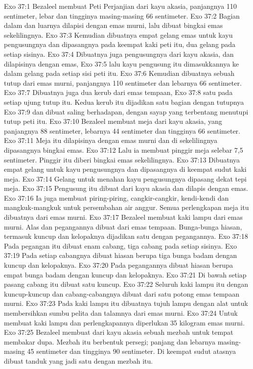 Exo 37:1  Bezaleel membuat Peti Perjanjian dari kayu akasia, panjangnya 110 sentimeter, lebar dan tingginya masing-masing 66 sentimeter.
Exo 37:2  Bagian dalam dan luarnya dilapisi dengan emas murni, lalu dibuat bingkai emas sekelilingnya.
Exo 37:3  Kemudian dibuatnya empat gelang emas untuk kayu pengusungnya dan dipasangnya pada keempat kaki peti itu, dua gelang pada setiap sisinya.
Exo 37:4  Dibuatnya juga pengusungnya dari kayu akasia, dan dilapisinya dengan emas,
Exo 37:5  lalu kayu pengusung itu dimasukkannya ke dalam gelang pada setiap sisi peti itu.
Exo 37:6  Kemudian dibuatnya sebuah tutup dari emas murni, panjangnya 110 sentimeter dan lebarnya 66 sentimeter.
Exo 37:7  Dibuatnya juga dua kerub dari emas tempaan,
Exo 37:8  satu pada setiap ujung tutup itu. Kedua kerub itu dijadikan satu bagian dengan tutupnya
Exo 37:9  dan dibuat saling berhadapan, dengan sayap yang terbentang menutupi tutup peti itu.
Exo 37:10  Bezaleel membuat meja dari kayu akasia, yang panjangnya 88 sentimeter, lebarnya 44 sentimeter dan tingginya 66 sentimeter.
Exo 37:11  Meja itu dilapisinya dengan emas murni dan di sekelilingnya dipasangnya bingkai emas.
Exo 37:12  Lalu ia membuat pinggir meja selebar 7,5 sentimeter. Pinggir itu diberi bingkai emas sekelilingnya.
Exo 37:13  Dibuatnya empat gelang untuk kayu pengusungnya dan dipasangnya di keempat sudut kaki meja.
Exo 37:14  Gelang untuk menahan kayu pengusungnya dipasang dekat tepi meja.
Exo 37:15  Pengusung itu dibuat dari kayu akasia dan dilapis dengan emas.
Exo 37:16  Ia juga membuat piring-piring, cangkir-cangkir, kendi-kendi dan mangkuk-mangkuk untuk persembahan air anggur. Semua perlengkapan meja itu dibuatnya dari emas murni.
Exo 37:17  Bezaleel membuat kaki lampu dari emas murni. Alas dan pegangannya dibuat dari emas tempaan. Bunga-bunga hiasan, termasuk kuncup dan kelopaknya dijadikan satu dengan pegangannya.
Exo 37:18  Pada pegangan itu dibuat enam cabang, tiga cabang pada setiap sisinya.
Exo 37:19  Pada setiap cabangnya dibuat hiasan berupa tiga bunga badam dengan kuncup dan kelopaknya.
Exo 37:20  Pada pegangannya dibuat hiasan berupa empat bunga badam dengan kuncup dan kelopaknya.
Exo 37:21  Di bawah setiap pasang cabang itu dibuat satu kuncup.
Exo 37:22  Seluruh kaki lampu itu dengan kuncup-kuncup dan cabang-cabangnya dibuat dari satu potong emas tempaan murni.
Exo 37:23  Pada kaki lampu itu dibuatnya tujuh lampu dengan alat untuk membersihkan sumbu pelita dan talamnya dari emas murni.
Exo 37:24  Untuk membuat kaki lampu dan perlengkapannya diperlukan 35 kilogram emas murni.
Exo 37:25  Bezaleel membuat dari kayu akasia sebuah mezbah untuk tempat membakar dupa. Mezbah itu berbentuk persegi; panjang dan lebarnya masing-masing 45 sentimeter dan tingginya 90 sentimeter. Di keempat sudut atasnya dibuat tanduk yang jadi satu dengan mezbah itu.
